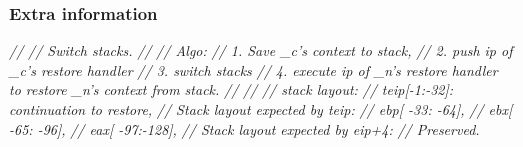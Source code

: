 \documentclass[]{book}
\newenvironment{Shaded}{}{}
\newcommand{\CommentTok}[1]{\textcolor[rgb]{0.50,0.50,0.50}{\textit{{#1}}}}
\begin{document}
\subsubsection*{Extra information}\label{extra-information}

\begin{Shaded}
\begin{Highlighting}[]

        \CommentTok{//}
        \CommentTok{// Switch stacks.}
        \CommentTok{//}
        \CommentTok{// Algo:}
        \CommentTok{//   1. Save _c's context to stack,}
        \CommentTok{//   2. push ip of _c's restore handler}
        \CommentTok{//   3. switch stacks}
        \CommentTok{//   4. execute ip of _n's restore handler to restore _n's context from stack.}
        \CommentTok{//}
        \CommentTok{//}
        \CommentTok{// stack layout:}
        \CommentTok{//  teip[-1:-32]: continuation to restore,}
        \CommentTok{//  Stack layout expected by teip:}
        \CommentTok{//     ebp[ -33: -64],}
        \CommentTok{//     ebx[ -65: -96],}
        \CommentTok{//     eax[ -97:-128],}
        \CommentTok{//     Stack layout expected by eip+4:}
        \CommentTok{//        Preserved.}


\end{Highlighting}
\end{Shaded}
\end{document}
